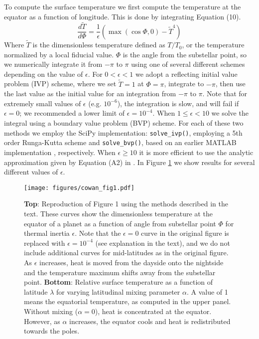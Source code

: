 \documentclass[linenumbers,5p,twocolumn,authoryear]{elsarticle}
\begin{document}
To compute the surface temperature we first compute the temperature at the equator as a function of longitude. This is done by integrating \citet{cowan2011} Equation (10).
\begin{equation}
    \frac{d \tilde{T}}{d \Phi} = \frac{1}{\epsilon}(\max{(\cos{\Phi}, 0)} - \tilde{T}^4)
\end{equation}
Where $\tilde{T}$ is the dimensionless temperature defined as $T/T_0$, or the temperature normalized by a local fiducial value. $\Phi$ is the angle from the substellar point, so we numerically integrate it from $-\pi$ to $\pi$ using one of several different schemes depending on the value of $\epsilon$. For $0 < \epsilon < 1$ we adopt a reflecting initial value problem (IVP) scheme, where we set $\tilde{T}=1$ at $\Phi=\pi$, integrate to $-\pi$, then use the last value as the initial value for an integration from $-\pi$ to $\pi$. Note that for extremely small values of $\epsilon$ (e.g. $10^{-6}$), the integration is slow, and will fail if $\epsilon=0$; we recommended a lower limit of $\epsilon=10^{-4}$. When $1\le \epsilon < 10$ we solve the integral using a boundary value problem (BVP) scheme. For each of these two methods we employ the SciPy \citep{virtanen2020} implementation: \texttt{solve\_ivp()}, employing a 5th order Runga-Kutta scheme \citep{dormand1980} and \texttt{solve\_bvp()}, based on an earlier MATLAB implementation \citep{kierzenka2001}, respectively. When $\epsilon \ge 10$ it is more efficient to use the analytic approximation given by Equation (A2) in \citet{cowan2011}. In Figure \ref{fig:cowan_curves} we show results for several different values of $\epsilon$.

\begin{figure}
    \centering
    \texttt{[image: figures/cowan\_fig1.pdf]}
    \caption{
        {\bf Top}: Reproduction of \citet{cowan2011} Figure 1 using the methods described in the text. These curves show the dimensionless temperature at the equator of a planet as a function of angle from substellar point $\Phi$ for thermal inertia $\epsilon$. Note that the $\epsilon=0$ curve in the original figure is replaced with $\epsilon=10^{-4}$ (see explanation in the text), and we do not include additional curves for mid-latitudes as in the original figure. As $\epsilon$ increases, heat is moved from the dayside onto the nightside and the temperature maximum shifts away from the substellar point.
        {\bf Bottom}: Relative surface temperature as a function of latitude $\lambda$ for varying latitudinal mixing parameter $\alpha$. A value of 1 means the equatorial temperature, as computed in the upper panel. Without mixing ($\alpha=0$), heat is concentrated at the equator. However, as $\alpha$ increases, the equator cools and heat is redistributed towards the poles.
    }
    \label{fig:cowan_curves}
\end{figure}
\end{document}
